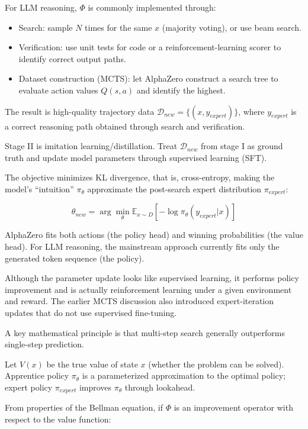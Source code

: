 For LLM reasoning, \(\Phi\) is commonly implemented through:

\begin{itemize}
\tightlist
\item
  Search: sample \(N\) times for the same \(x\) (majority voting), or use beam search.
\item
  Verification: use unit tests for code or a reinforcement-learning scorer to identify correct output paths.
\item
  Dataset construction (MCTS): let AlphaZero construct a search tree to evaluate action values \(Q(s,a)\) and identify the highest.
\end{itemize}

The result is high-quality trajectory data \(\mathcal{D}_{new}=\{(x,y_{expert})\}\), where \(y_{expert}\) is a correct reasoning path obtained through search and verification.

Stage II is imitation learning/distillation. Treat \(\mathcal{D}_{new}\) from stage I as ground truth and update model parameters through supervised learning (SFT).

The objective minimizes KL divergence, that is, cross-entropy, making the model's ``intuition'' \(\pi_\theta\) approximate the post-search expert distribution \(\pi_{expert}\):

\[
\theta_{new}=\arg\min_\theta \mathbb{E}_{x\sim D}\left[-\log\pi_\theta(y_{expert}|x)\right]
\]

AlphaZero fits both actions (the policy head) and winning probabilities (the value head). For LLM reasoning, the mainstream approach currently fits only the generated token sequence (the policy).

Although the parameter update looks like supervised learning, it performs policy improvement and is actually reinforcement learning under a given environment and reward. The earlier MCTS discussion also introduced expert-iteration updates that do not use supervised fine-tuning.

A key mathematical principle is that multi-step search generally outperforms single-step prediction.

Let \(V(x)\) be the true value of state \(x\) (whether the problem can be solved). Apprentice policy \(\pi_\theta\) is a parameterized approximation to the optimal policy; expert policy \(\pi_{expert}\) improves \(\pi_\theta\) through lookahead.

From properties of the Bellman equation, if \(\Phi\) is an improvement operator with respect to the value function:

